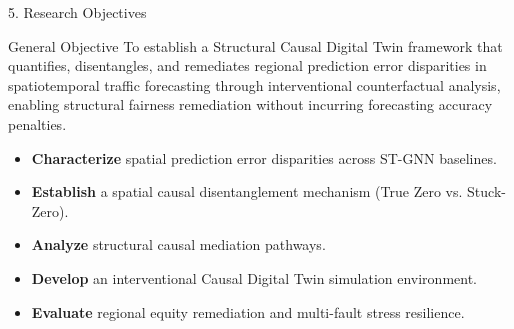 \documentclass[aspectratio=169, 10pt]{beamer}
\begin{document}
\begin{frame}{5. Research Objectives}
  \begin{block}{General Objective}
    To establish a Structural Causal Digital Twin framework that quantifies, disentangles, and remediates regional prediction error disparities in spatiotemporal traffic forecasting through interventional counterfactual analysis, enabling structural fairness remediation without incurring forecasting accuracy penalties.
  \end{block}
  
  \begin{itemize}
    \item \textbf{Characterize} spatial prediction error disparities across ST-GNN baselines.
    \item \textbf{Establish} a spatial causal disentanglement mechanism (True Zero vs. Stuck-Zero).
    \item \textbf{Analyze} structural causal mediation pathways.
    \item \textbf{Develop} an interventional Causal Digital Twin simulation environment.
    \item \textbf{Evaluate} regional equity remediation and multi-fault stress resilience.
  \end{itemize}
\end{frame}
\end{document}
